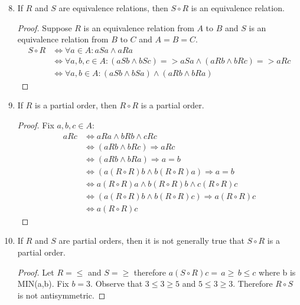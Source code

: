 \documentclass{article}
\begin{document}
  \begin{enumerate} \setcounter{enumi}{7}
    \item If $R$ and $S$ are equivalence relations, then $S \circ R$ is an equivalence relation.
      \begin{proof}
        Suppose $R$ is an equivalence relation from $A$ to $B$ and $S$ is an equivalence relation from $B$ to $C$ and $A = B = C$.
        \begin{align*}
          S \circ R &\iff \forall a\in A : aSa \wedge aRa \\
          &\iff \forall a,b,c\in A: (aSb \wedge bSc) => aSa \wedge (aRb \wedge bRc) => aRc \\
            &\iff \forall a,b\in A: (aSb \wedge bSa) \wedge (aRb \wedge bRa) 
        \end{align*}
      \end{proof}
    \item If $R$ is a partial order, then $R \circ R$ is a partial order.
      \begin{proof}
        Fix $a,b,c\in A$:
        \begin{align*}
          aRc &\iff aRa \wedge bRb \wedge cRc \\
            &\iff (aRb \wedge bRc) \Rightarrow aRc \\
            &\iff (aRb \wedge bRa) \Rightarrow a = b \\
            &\iff (a(R \circ R)b \wedge b(R \circ R)a) \Rightarrow a = b \\
            &\iff a(R \circ R)a \wedge b(R \circ R)b \wedge c(R \circ R)c \\
            &\iff (a(R \circ R)b \wedge b(R \circ R)c) \Rightarrow a(R \circ R)c \\ 
            &\iff a(R \circ R)c
        \end{align*}
      \end{proof}
    \item If $R$ and $S$ are partial orders, then it is not generally true that $S \circ R$ is a partial order.
      \begin{proof}
        Let $R = \le$ and $S = \ge$ therefore $a(S \circ R)c =\, a\ge\, b \le c$ where b is MIN(a,b). Fix $b = 3$. Observe that $3 \le 3 \ge 5$ and $5 \le 3 \ge 3$. Therefore $R \circ S$ is not antisymmetric. 
      \end{proof}
  \end{enumerate}
\end{document}
